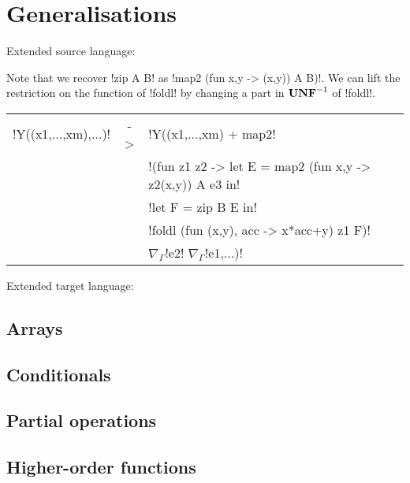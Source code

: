 \section{Generalisations}
\label{sec:generalisation}


Extended source language:



% 

Note that we recover !zip A B! as !map2 (fun x,y -> (x,y)) A B)!. 
We can lift the restriction on the function of !foldl! by changing a part in $\mathbf{UNF}^{-1}$ of !foldl!.
\begin{center}
\begin{tabular}{r c l}
    !Y((x1,...,xm),...)! & -> &  !Y((x1,...,xm) + map2! \\
        && !(fun z1 z2 -> let E = map2 (fun x,y -> z2(x,y)) A e3 in! \\
        &&  !let F = zip B E in!\\
        && !foldl (fun (x,y), acc  -> x*acc+y) z1 F)! \\
        && $\nabla_{\Gamma}$!e2! $\nabla_{\Gamma}$!e1,...)!
\end{tabular}
\end{center}

Extended target language:

% 

% 

\subsection{Arrays}

\subsection{Conditionals} 

\subsection{Partial operations} 

\subsection{Higher-order functions}
